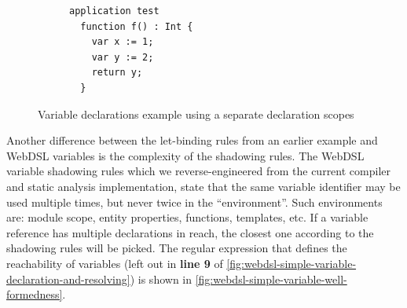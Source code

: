       \begin{figure}
        \begin{subfigure}[b]{0.3\textwidth}
          \begin{verbatim}
application test
  function f() : Int {
    var x := 1;
    var y := 2;
    return y;
  }
          \end{verbatim}
          \caption{\label{fig:webdsl-basics-declaration-scope-example-code}}
        \end{subfigure}
        \begin{subfigure}[b]{0.7\textwidth}
          \centering
          \caption{\label{fig:webdsl-basics-declaration-scope-example-sg}}
        \end{subfigure}
        \caption{\label{fig:webdsl-basics-declaration-scope-example}Variable declarations example using a separate declaration scopes}
      \end{figure}

      Another difference between the let-binding rules from an earlier example and WebDSL variables is the complexity of the shadowing rules. The WebDSL variable shadowing rules which we reverse-engineered from the current compiler and static analysis implementation, state that the same variable identifier may be used multiple times, but never twice in the ``environment''. Such environments are: module scope, entity properties, functions, templates, etc. If a variable reference has multiple declarations in reach, the closest one according to the shadowing rules will be picked. The regular expression that defines the reachability of variables (left out in \textbf{line 9} of \cref{fig:webdsl-simple-variable-declaration-and-resolving}) is shown in \cref{fig:webdsl-simple-variable-well-formedness}.

